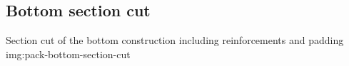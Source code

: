 \subsection{Bottom section cut}

{Section cut of the bottom construction including reinforcements and padding}
{img:pack-bottom-section-cut}
